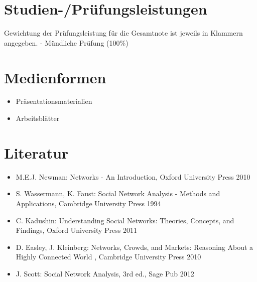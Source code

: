 \section*{Studien-/Prüfungsleistungen\label{/mi-2017/modulbeschreibungen-master/MA_SC_Modul_Netzwerk--und-Graphentheorie}}\label{studien-pruxfcfungsleistungenpathlabelmi-2017modulbeschreibungen-mastermaux5fscux5fmodulux5fnetzwerkund-graphentheorie}

Gewichtung der Prüfungsleistung für die Gesamtnote ist jeweils in
Klammern angegeben. - Mündliche Prüfung (100\%)

\section*{Medienformen\label{/mi-2017/modulbeschreibungen-master/MA_SC_Modul_Netzwerk--und-Graphentheorie}}\label{medienformenpathlabelmi-2017modulbeschreibungen-mastermaux5fscux5fmodulux5fnetzwerkund-graphentheorie}

\begin{itemize}
\tightlist
\item
  Präsentationsmaterialien
\item
  Arbeitsblätter
\end{itemize}

\section*{Literatur\label{/mi-2017/modulbeschreibungen-master/MA_SC_Modul_Netzwerk--und-Graphentheorie}}\label{literaturpathlabelmi-2017modulbeschreibungen-mastermaux5fscux5fmodulux5fnetzwerkund-graphentheorie}

\begin{itemize}
\tightlist
\item
  M.E.J. Newman: Networks - An Introduction, Oxford University Press
  2010
\item
  S. Wassermann, K. Faust: Social Network Analysis - Methods and
  Applications, Cambridge University Press 1994
\item
  C. Kadushin: Understanding Social Networks: Theories, Concepts, and
  Findings, Oxford University Press 2011
\item
  D. Easley, J. Kleinberg: Networks, Crowds, and Markets: Reasoning
  About a Highly Connected World , Cambridge University Press 2010
\item
  J. Scott: Social Network Analysis, 3rd ed., Sage Pub 2012
\end{itemize}

